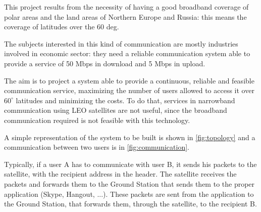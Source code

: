 This project results from the necessity of having a good broadband coverage of polar
areas and the land areas of Northern Europe and Russia: this means the coverage of
latitudes over the 60 deg.

The subjects interested in this kind of communication are
mostly industries involved in economic sector: they need a reliable communication system able to provide a service of 50 Mbps in download and 5 Mbps in upload.


The aim is to project a system able to provide a continuous, reliable and feasible communication service, maximizing the number of users allowed to access it over $60^\circ$
latitudes and minimizing the costs. To do that, services in narrowband communication using LEO satellites are not useful, since the broadband communication required is not feasible with this technology.

A simple representation of the system to be built is shown in \autoref{fig:topology} and a communication between two users is in \autoref{fig:communication}.

Typically, if a user A has to communicate with user B, it sends his packets to the satellite, with the recipient address in the header.
The satellite receives the packets and forwards them to the Ground Station that sends them to the proper application (Skype, Hangout, ...).
These packets are sent from the application to the Ground Station, that forwards them, through the satellite, to the recipient B.
